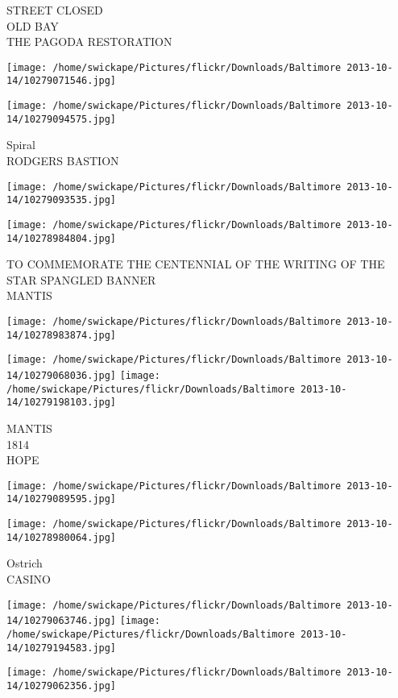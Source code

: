 \documentclass[10pt,letterpaper]{article}
\begin{document}
STREET CLOSED\\
OLD BAY\\
THE PAGODA RESTORATION
\pagebreak

\texttt{[image: /home/swickape/Pictures/flickr/Downloads/Baltimore 2013-10-14/10279071546.jpg]}

\vspace{0.25in}
\texttt{[image: /home/swickape/Pictures/flickr/Downloads/Baltimore 2013-10-14/10279094575.jpg]}

Spiral\\
RODGERS BASTION
\pagebreak

\texttt{[image: /home/swickape/Pictures/flickr/Downloads/Baltimore 2013-10-14/10279093535.jpg]}

\vspace{0.25in}
\texttt{[image: /home/swickape/Pictures/flickr/Downloads/Baltimore 2013-10-14/10278984804.jpg]}

TO COMMEMORATE THE CENTENNIAL OF THE WRITING OF THE STAR SPANGLED BANNER\\
MANTIS
\pagebreak

\texttt{[image: /home/swickape/Pictures/flickr/Downloads/Baltimore 2013-10-14/10278983874.jpg]}

\vspace{0.25in}
\texttt{[image: /home/swickape/Pictures/flickr/Downloads/Baltimore 2013-10-14/10279068036.jpg]}
\texttt{[image: /home/swickape/Pictures/flickr/Downloads/Baltimore 2013-10-14/10279198103.jpg]}

MANTIS\\
1814\\
HOPE
\pagebreak

\texttt{[image: /home/swickape/Pictures/flickr/Downloads/Baltimore 2013-10-14/10279089595.jpg]}

\vspace{0.25in}
\texttt{[image: /home/swickape/Pictures/flickr/Downloads/Baltimore 2013-10-14/10278980064.jpg]}

Ostrich\\
CASINO
\pagebreak

\texttt{[image: /home/swickape/Pictures/flickr/Downloads/Baltimore 2013-10-14/10279063746.jpg]}
\texttt{[image: /home/swickape/Pictures/flickr/Downloads/Baltimore 2013-10-14/10279194583.jpg]}

\texttt{[image: /home/swickape/Pictures/flickr/Downloads/Baltimore 2013-10-14/10279062356.jpg]}
\end{document}
